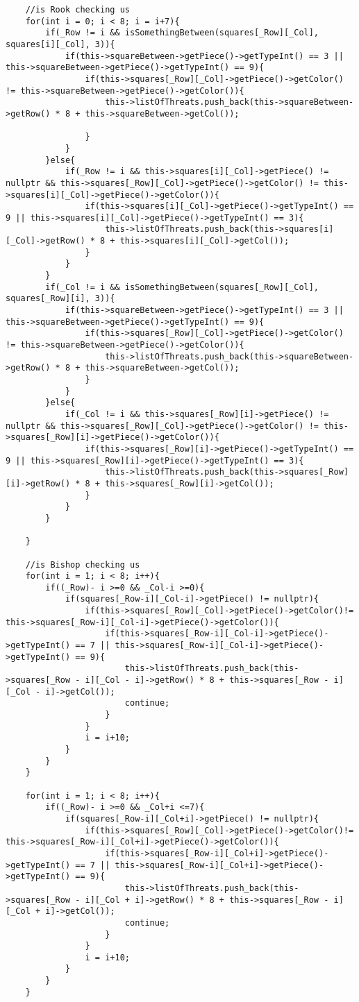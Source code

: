 \documentclass[]{report}
\begin{document}
\begin{flushleft}
\begin{lstlisting}
	//is Rook checking us
	for(int i = 0; i < 8; i = i+7){
		if(_Row != i && isSomethingBetween(squares[_Row][_Col], squares[i][_Col], 3)){
			if(this->squareBetween->getPiece()->getTypeInt() == 3 || this->squareBetween->getPiece()->getTypeInt() == 9){
				if(this->squares[_Row][_Col]->getPiece()->getColor() != this->squareBetween->getPiece()->getColor()){
					this->listOfThreats.push_back(this->squareBetween->getRow() * 8 + this->squareBetween->getCol());
					
				}
			}
		}else{
			if(_Row != i && this->squares[i][_Col]->getPiece() != nullptr && this->squares[_Row][_Col]->getPiece()->getColor() != this->squares[i][_Col]->getPiece()->getColor()){
				if(this->squares[i][_Col]->getPiece()->getTypeInt() == 9 || this->squares[i][_Col]->getPiece()->getTypeInt() == 3){
					this->listOfThreats.push_back(this->squares[i][_Col]->getRow() * 8 + this->squares[i][_Col]->getCol());
				}
			}
		}
		if(_Col != i && isSomethingBetween(squares[_Row][_Col], squares[_Row][i], 3)){
			if(this->squareBetween->getPiece()->getTypeInt() == 3 || this->squareBetween->getPiece()->getTypeInt() == 9){
				if(this->squares[_Row][_Col]->getPiece()->getColor() != this->squareBetween->getPiece()->getColor()){
					this->listOfThreats.push_back(this->squareBetween->getRow() * 8 + this->squareBetween->getCol());
				}
			}
		}else{
			if(_Col != i && this->squares[_Row][i]->getPiece() != nullptr && this->squares[_Row][_Col]->getPiece()->getColor() != this->squares[_Row][i]->getPiece()->getColor()){
				if(this->squares[_Row][i]->getPiece()->getTypeInt() == 9 || this->squares[_Row][i]->getPiece()->getTypeInt() == 3){
					this->listOfThreats.push_back(this->squares[_Row][i]->getRow() * 8 + this->squares[_Row][i]->getCol());
				}
			}
		}
		
	}
	
	//is Bishop checking us
	for(int i = 1; i < 8; i++){
		if((_Row)- i >=0 && _Col-i >=0){
			if(squares[_Row-i][_Col-i]->getPiece() != nullptr){
				if(this->squares[_Row][_Col]->getPiece()->getColor()!= this->squares[_Row-i][_Col-i]->getPiece()->getColor()){
					if(this->squares[_Row-i][_Col-i]->getPiece()->getTypeInt() == 7 || this->squares[_Row-i][_Col-i]->getPiece()->getTypeInt() == 9){
						this->listOfThreats.push_back(this->squares[_Row - i][_Col - i]->getRow() * 8 + this->squares[_Row - i][_Col - i]->getCol());
						continue;
					}
				}
				i = i+10;
			}
		}
	}
	
	for(int i = 1; i < 8; i++){
		if((_Row)- i >=0 && _Col+i <=7){
			if(squares[_Row-i][_Col+i]->getPiece() != nullptr){
				if(this->squares[_Row][_Col]->getPiece()->getColor()!= this->squares[_Row-i][_Col+i]->getPiece()->getColor()){
					if(this->squares[_Row-i][_Col+i]->getPiece()->getTypeInt() == 7 || this->squares[_Row-i][_Col+i]->getPiece()->getTypeInt() == 9){
						this->listOfThreats.push_back(this->squares[_Row - i][_Col + i]->getRow() * 8 + this->squares[_Row - i][_Col + i]->getCol());
						continue;
					}
				}
				i = i+10;
			}
		}
	}
	

\end{lstlisting}
\end{flushleft}
\end{document}
